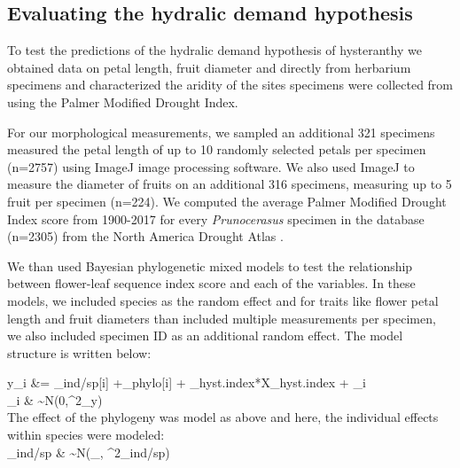 \documentclass{article}\usepackage[]{graphicx}\usepackage[]{color}
\begin{document}
\subsection{Evaluating the hydralic demand hypothesis}

To test the predictions of the hydralic demand hypothesis of hysteranthy we obtained data on  petal length, fruit diameter and directly from herbarium specimens and characterized the aridity of the sites specimens were collected from using the Palmer Modified Drought Index.

\noindent For our morphological measurements, we sampled an additional 321 specimens measured the petal length of up to 10 randomly selected petals per specimen (n=2757) using ImageJ image processing software. We also used ImageJ to measure the diameter of fruits on an additional 316 specimens, measuring up to 5 fruit per specimen (n=224).
We computed the average Palmer Modified Drought Index score from 1900-2017 for every \textit{Prunocerasus} specimen in the database (n=2305) from the North America Drought Atlas \citep{Cook2004}.

We than used Bayesian phylogenetic mixed models to test the relationship between flower-leaf sequence index score and each of the variables. In these models, we included species as the random effect and for traits like flower petal length and fruit diameters than included multiple measurements per specimen, we also included specimen ID as an additional random effect. The model structure is written below: 


  y_i &= \alpha_{ind/sp[i]} +\alpha_{phylo[i]} + \beta_{hyst.index}*X_{hyst.index} + \epsilon_i\\
  
  \epsilon_i & \sim N(0,\sigma^2_y) \\ %
  
  \noindent The effect of the phylogeny was model as above and here, the individual effects within species were modeled:\\
  \alpha_{ind/sp} & \sim N(\mu_{\alpha}, \sigma^2_{ind/sp}) \\
  



\end{document}

